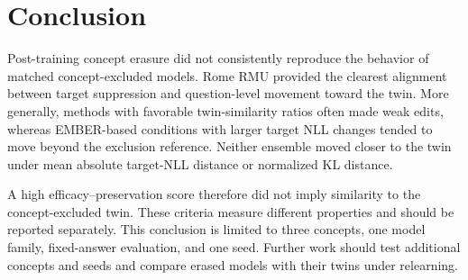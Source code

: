 \section{Conclusion}
\label{sec:conclusion}

Post-training concept erasure did not consistently reproduce the behavior of
matched concept-excluded models. Rome RMU provided the clearest alignment
between target suppression and question-level movement toward the twin. More
generally, methods with favorable twin-similarity ratios often made weak edits,
whereas EMBER-based conditions with larger target NLL changes tended to move
beyond the exclusion reference. Neither ensemble moved closer to the twin
under mean absolute target-NLL distance or normalized KL distance.

A high efficacy--preservation score therefore did not imply similarity to the
concept-excluded twin. These criteria measure different properties and should
be reported separately. This conclusion is limited to three concepts, one
model family, fixed-answer evaluation, and one seed. Further work should test
additional concepts and seeds and compare erased models with their twins under
relearning.
